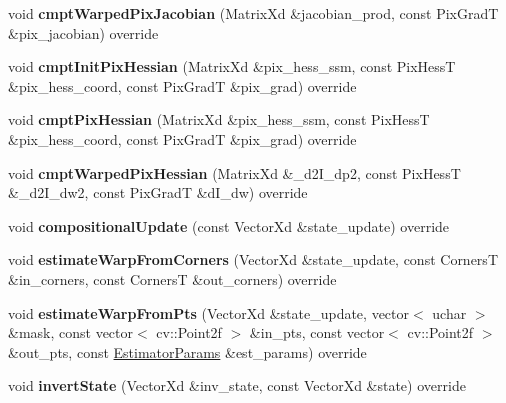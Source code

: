 \begin{DoxyCompactItemize}
\item 
\hypertarget{classAffine_a0250ee9810c77fd9d8be873290512c67}{void {\bfseries cmpt\-Warped\-Pix\-Jacobian} (Matrix\-Xd \&jacobian\-\_\-prod, const Pix\-Grad\-T \&pix\-\_\-jacobian) override}\label{classAffine_a0250ee9810c77fd9d8be873290512c67}

\item 
\hypertarget{classAffine_a8e7721884e32d979034ae971103605a6}{void {\bfseries cmpt\-Init\-Pix\-Hessian} (Matrix\-Xd \&pix\-\_\-hess\-\_\-ssm, const Pix\-Hess\-T \&pix\-\_\-hess\-\_\-coord, const Pix\-Grad\-T \&pix\-\_\-grad) override}\label{classAffine_a8e7721884e32d979034ae971103605a6}

\item 
\hypertarget{classAffine_aaa0914ba34479e043c21a7e1e8546fa4}{void {\bfseries cmpt\-Pix\-Hessian} (Matrix\-Xd \&pix\-\_\-hess\-\_\-ssm, const Pix\-Hess\-T \&pix\-\_\-hess\-\_\-coord, const Pix\-Grad\-T \&pix\-\_\-grad) override}\label{classAffine_aaa0914ba34479e043c21a7e1e8546fa4}

\item 
\hypertarget{classAffine_a1e07504716b5d116642e03cf8f63bbfd}{void {\bfseries cmpt\-Warped\-Pix\-Hessian} (Matrix\-Xd \&\-\_\-d2\-I\-\_\-dp2, const Pix\-Hess\-T \&\-\_\-d2\-I\-\_\-dw2, const Pix\-Grad\-T \&d\-I\-\_\-dw) override}\label{classAffine_a1e07504716b5d116642e03cf8f63bbfd}

\item 
\hypertarget{classAffine_a00875afed231c96bd0833381cd72c85c}{void {\bfseries compositional\-Update} (const Vector\-Xd \&state\-\_\-update) override}\label{classAffine_a00875afed231c96bd0833381cd72c85c}

\item 
\hypertarget{classAffine_aad1af65ac5dda80f4e29ea780be90c3a}{void {\bfseries estimate\-Warp\-From\-Corners} (Vector\-Xd \&state\-\_\-update, const Corners\-T \&in\-\_\-corners, const Corners\-T \&out\-\_\-corners) override}\label{classAffine_aad1af65ac5dda80f4e29ea780be90c3a}

\item 
\hypertarget{classAffine_a3c6142bde028148e1617e23cdcf48904}{void {\bfseries estimate\-Warp\-From\-Pts} (Vector\-Xd \&state\-\_\-update, vector$<$ uchar $>$ \&mask, const vector$<$ cv\-::\-Point2f $>$ \&in\-\_\-pts, const vector$<$ cv\-::\-Point2f $>$ \&out\-\_\-pts, const \hyperlink{structSSMEstimatorParams}{Estimator\-Params} \&est\-\_\-params) override}\label{classAffine_a3c6142bde028148e1617e23cdcf48904}

\item 
\hypertarget{classAffine_abf133012708202550e4aa16161ce93a5}{void {\bfseries invert\-State} (Vector\-Xd \&inv\-\_\-state, const Vector\-Xd \&state) override}\label{classAffine_abf133012708202550e4aa16161ce93a5}


\end{DoxyCompactItemize}

